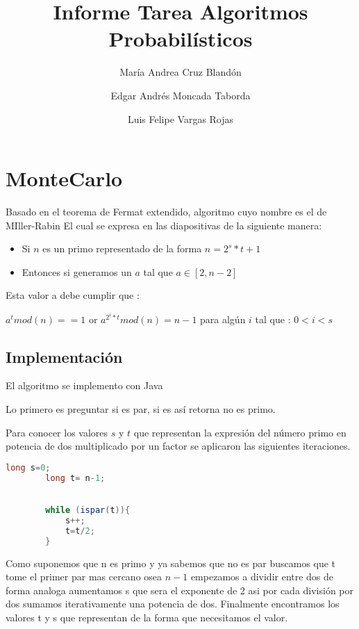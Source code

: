 \documentclass[a4paper,10pt]{article}
\title{Informe Tarea Algoritmos Probabilísticos}
\author{María Andrea Cruz Blandón \and Edgar Andrés Moncada Taborda \and Luis Felipe Vargas Rojas}
\begin{document}
\maketitle

\section{MonteCarlo}

Basado en el teorema de Fermat extendido, algoritmo cuyo nombre es el  de  MIller-Rabin El cual se expresa en las diapositivas de la siguiente manera:

\begin{itemize}

\item Si $n$ es un primo representado de la forma $n=2^s*t+1$

\item Entonces si generamos un $a$  tal que $a \in [2,n-2]$ 


\end{itemize}

Esta valor a debe cumplir que :

\begin{center}
$a^t mod (n) == 1$ or  $a^{2^i*t}mod (n) = n-1$
para algún  $i$ tal que : $0<i<s  $
\end{center} 



\subsection{Implementación}
El  algoritmo se implemento con Java


Lo primero es preguntar si es par, si es así retorna no es primo.

Para conocer los valores $s$ y $t$ que representan la expresión del número primo en potencia de dos multiplicado por un factor se aplicaron las siguientes iteraciones.



\begin{lstlisting}[language=java]
		long s=0;
		long t= n-1;

		
		while (ispar(t)){
			s++;
			t=t/2;
		}
\end{lstlisting}

Como suponemos que n es primo y ya sabemos que no es par buscamos que t tome el primer par mas cercano osea $n-1$ empezamos a dividir entre dos de forma analoga aumentamos s que sera el exponente de 2 asi por cada división por dos sumamos iterativamente una potencia de dos. Finalmente  encontramos los valores t y s que representan de la forma que necesitamos el valor.
\end{document}
